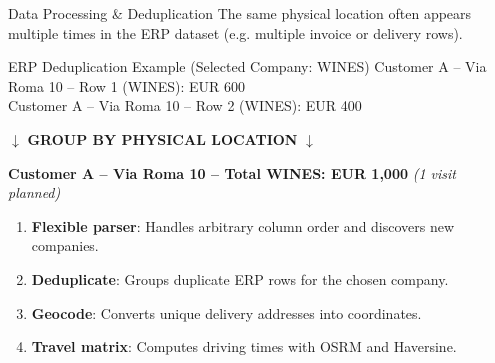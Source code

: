 \begin{frame}{Data Processing \& Deduplication}
The same physical location often appears multiple times in the ERP dataset (e.g. multiple invoice or delivery rows).

\vspace{0.15cm}
\begin{block}{ERP Deduplication Example (Selected Company: WINES)}
\centering \footnotesize
Customer A -- Via Roma 10 -- Row 1 (WINES): EUR 600\\
Customer A -- Via Roma 10 -- Row 2 (WINES): EUR 400

\vspace{0.1cm}
$\downarrow$ \textbf{GROUP BY PHYSICAL LOCATION} $\downarrow$

\vspace{0.1cm}
\textbf{Customer A -- Via Roma 10 -- Total WINES: EUR 1,000} \textit{(1 visit planned)}
\end{block}

\vspace{0.2cm}
\begin{enumerate}\setlength{\itemsep}{3pt}
    \small
    \item \textbf{Flexible parser}: Handles arbitrary column order and discovers new companies.
    \item \textbf{Deduplicate}: Groups duplicate ERP rows for the chosen company.
    \item \textbf{Geocode}: Converts unique delivery addresses into coordinates.
    \item \textbf{Travel matrix}: Computes driving times with OSRM and Haversine.
\end{enumerate}
\end{frame}
